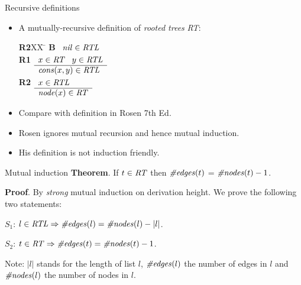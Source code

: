 \documentclass[style=sailor,size=12pt]{powerdot}
\newcommand{\id}[1]{\mbox{\it #1\/}}
\begin{document}
\begin{wideslide}[bm=,toc=]{Recursive definitions}
\begin{itemize}
\item A mutually-recursive definition of {\em rooted trees\/} {\em RT\/}:
\begin{tabbing}
{\bf R2}XX \=  \kill
{\bf B} \>
        \(\begin{array}[t]{l}
        \id{nil}\in\id{RTL}
        \end{array}\) \\[2ex]
{\bf R1} \>
        \(\begin{array}[t]{l}
        x\in\id{RT}\;\;\;y\in\id{RTL} \\
        \hline
        \id{cons}(x,y)\in\id{RTL}
        \end{array}\) \\[2ex]
{\bf R2} \>
        \(\begin{array}[t]{l}
        x\in\id{RTL} \\
        \hline
        \id{node}(x)\in\id{RT}
        \end{array}\)
\end{tabbing}
\item Compare with definition in Rosen 7th Ed.
\item Rosen ignores mutual recursion and hence mutual induction.
\item His definition is not induction friendly.
\end{itemize}
\end{wideslide}

\begin{wideslide}[bm=,toc=]{Mutual induction}
{\bf Theorem}. If $t\in\id{RT}$ then $\id{\#edges}(t)$ = $\id{\#nodes}(t) - 1$.
\vspace{1em}

{\bf Proof}.  By {\em strong\/} mutual induction on derivation height. 
We prove the following two statements:
\vspace{1em}

$S_1$: $l\in \id{RTL}\Rightarrow \id{\#edges}(l) = \id{\#nodes}(l) - |l|$.

$S_2$: $t\in \id{RT}\Rightarrow \id{\#edges}(t) = \id{\#nodes}(t) - 1$.

\vspace{2em}
Note: $|l|$ stands for the length of list $l$, $\id{\#edges}(l)$ the number of edges in $l$
and $\id{\#nodes}(l)$ the number of nodes in $l$.
\end{wideslide}
\end{document}
